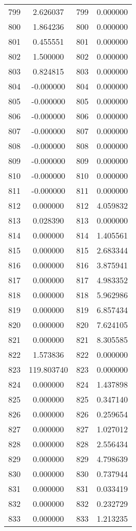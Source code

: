 \documentclass[12pt]{article}
\begin{document}
\begin{longtable}{@{}cccc@{}}
799 & 2.626037 & 799 & 0.000000 \\
800 & 1.864236 & 800 & 0.000000 \\
801 & 0.455551 & 801 & 0.000000 \\
802 & 1.500000 & 802 & 0.000000 \\
803 & 0.824815 & 803 & 0.000000 \\
804 & -0.000000 & 804 & 0.000000 \\
805 & -0.000000 & 805 & 0.000000 \\
806 & -0.000000 & 806 & 0.000000 \\
807 & -0.000000 & 807 & 0.000000 \\
808 & -0.000000 & 808 & 0.000000 \\
809 & -0.000000 & 809 & 0.000000 \\
810 & -0.000000 & 810 & 0.000000 \\
811 & -0.000000 & 811 & 0.000000 \\
812 & 0.000000 & 812 & 4.059832 \\
813 & 0.028390 & 813 & 0.000000 \\
814 & 0.000000 & 814 & 1.405561 \\
815 & 0.000000 & 815 & 2.683344 \\
816 & 0.000000 & 816 & 3.875941 \\
817 & 0.000000 & 817 & 4.983352 \\
818 & 0.000000 & 818 & 5.962986 \\
819 & 0.000000 & 819 & 6.857434 \\
820 & 0.000000 & 820 & 7.624105 \\
821 & 0.000000 & 821 & 8.305585 \\
822 & 1.573836 & 822 & 0.000000 \\
823 & 119.803740 & 823 & 0.000000 \\
824 & 0.000000 & 824 & 1.437898 \\
825 & 0.000000 & 825 & 0.347140 \\
826 & 0.000000 & 826 & 0.259654 \\
827 & 0.000000 & 827 & 1.027012 \\
828 & 0.000000 & 828 & 2.556434 \\
829 & 0.000000 & 829 & 4.798639 \\
830 & 0.000000 & 830 & 0.737944 \\
831 & 0.000000 & 831 & 0.033419 \\
832 & 0.000000 & 832 & 0.232729 \\
833 & 0.000000 & 833 & 1.213235 \\

\end{longtable}
\end{document}
